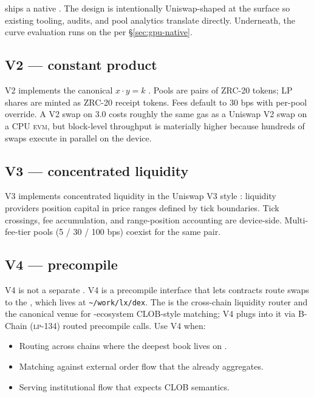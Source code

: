 \section{\Zoo{} \DEX{}}
\label{sec:zoo-dex}

\Zoo{} ships a native \AMM{} \DEX{}. The design is intentionally
Uniswap-shaped at the surface so existing tooling, audits, and pool
analytics translate directly. Underneath, the curve evaluation runs on
the \GPU{} per \S\ref{sec:gpu-native}.

\subsection{V2 --- constant product}

V2 implements the canonical $x \cdot y = k$ \AMM{}. Pools are pairs of
ZRC-20 tokens; LP shares are minted as ZRC-20 receipt tokens. Fees default
to 30 bps with per-pool override. A V2 swap on \Zoo{} 3.0 costs roughly
the same gas as a Uniswap V2 swap on a CPU \textsc{evm}, but block-level
throughput is materially higher because hundreds of swaps execute in
parallel on the device.

\subsection{V3 --- concentrated liquidity}

V3 implements concentrated liquidity in the Uniswap V3 style
\cite{uniswap-v3}: liquidity providers position capital in price ranges
defined by tick boundaries. Tick crossings, fee accumulation, and
range-position accounting are device-side. Multi-fee-tier pools
(5 / 30 / 100 bps) coexist for the same pair.

\subsection{V4 --- \Lux{} \DEX{} precompile}

V4 is not a separate \AMM{}. V4 is a precompile interface that lets
\Zoo{} contracts route swaps to the \Lux{} \DEX{} \cite{lux-dex},
which lives at \texttt{\textasciitilde/work/lx/dex}. The \Lux{} \DEX{}
is the cross-chain liquidity router and the canonical venue for
\Lux{}-ecosystem CLOB-style matching; \Zoo{} V4 plugs into it via
B-Chain (\textsc{lp-134}) routed precompile calls. Use V4 when:

\begin{itemize}[leftmargin=1.2em]
  \item Routing across chains where the deepest book lives on \Lux{}.
  \item Matching against external order flow that the \Lux{} \DEX{}
        already aggregates.
  \item Serving institutional flow that expects CLOB semantics.
\end{itemize}

